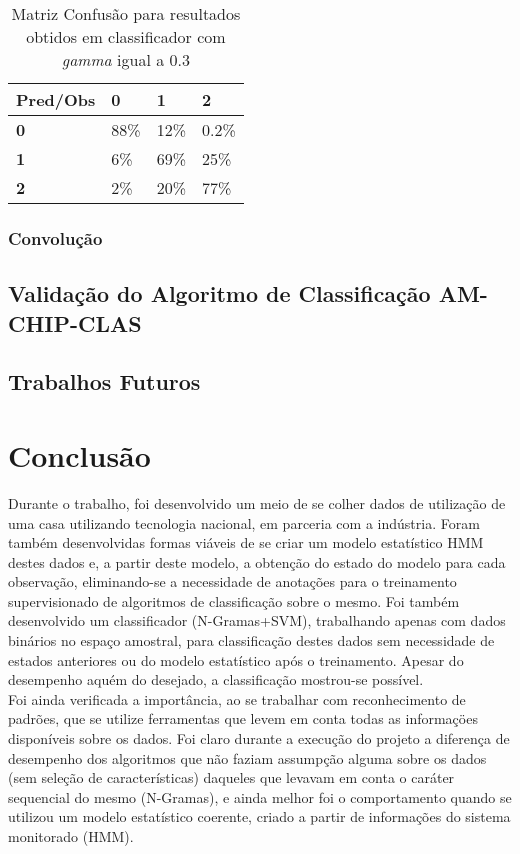\documentclass[
	12pt,				%
	openright,			%
	twoside,			%
	a4paper,			%
	english,			%
	spanish,			%
	brazil,				%
	]{abntex2}\usepackage[]{graphicx}\usepackage[]{color}
\begin{document}
\begin{table}[htb]
	\center
	\footnotesize
	\begin{tabular}{llll}
		\textbf{Pred/Obs} & \textbf{0}  & \textbf{1}  & \textbf{2} \\
		\hline
		\textbf{0} & 88\% & 12\% & 0.2\% \\
		\hline
		\textbf{1} & 6\% & 69\% & 25\% \\
		\hline
		\textbf{2} & 2\% & 20\% & 77\% \\
		\hline		
	\end{tabular}
	\caption{Matriz Confusão para resultados obtidos em classificador com \textit{gamma} igual a 0.3}
\end{table}


\subsection{Convolução}


\section{Validação do Algoritmo de Classificação AM-CHIP-CLAS}





\section{Trabalhos Futuros}

\chapter{Conclusão}

Durante o trabalho, foi desenvolvido um meio de se colher dados de utilização de uma casa utilizando tecnologia nacional, em parceria com a indústria. Foram também desenvolvidas formas viáveis de se criar um modelo estatístico HMM destes dados e, a partir deste modelo, a obtenção do estado do modelo para cada observação, eliminando-se a necessidade de anotações para o treinamento supervisionado de algoritmos de classificação sobre o mesmo. Foi também desenvolvido um classificador (N-Gramas+SVM), trabalhando apenas com dados binários no espaço amostral, para classificação destes dados sem necessidade de estados anteriores ou do modelo estatístico após o treinamento. Apesar do desempenho aquém do desejado, a classificação mostrou-se possível.\\
Foi ainda verificada a importância, ao se trabalhar com reconhecimento de padrões, que se utilize ferramentas que levem em conta todas as informaçöes disponíveis sobre os dados. Foi claro durante a execução do projeto a diferença de desempenho dos algoritmos que não faziam assumpção alguma sobre os dados (sem seleção de características) daqueles que levavam em conta o caráter sequencial do mesmo (N-Gramas), e ainda melhor foi o comportamento quando se utilizou um modelo estatístico coerente, criado a partir de informações do sistema monitorado (HMM). \\
\end{document}
